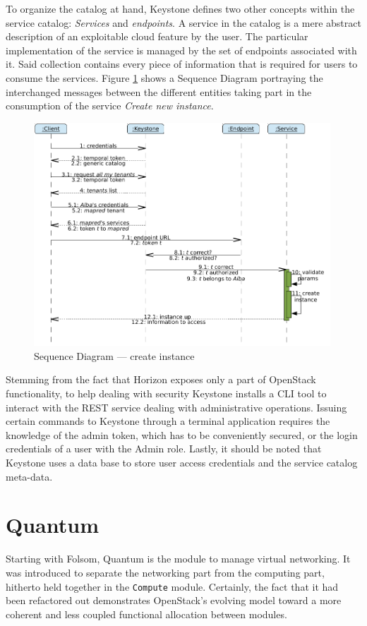 To organize the catalog at hand, Keystone defines two other concepts within the service catalog: \emph{Services} and \emph{endpoints}. A service in the catalog is a mere abstract description of an exploitable cloud feature by the user. The particular implementation of the service is managed by the set of endpoints associated with it. Said collection contains every piece of information that is required for users to consume the services. Figure \ref{fig:secuenciais} shows a Sequence Diagram portraying the interchanged messages between the different entities taking part in the consumption of the service \emph{Create new instance}.

\begin{figure}[tbp]
\begin{center}
\includegraphics[width=0.99\textwidth]{imagenes/013.pdf}
 \caption{Sequence Diagram --- create instance}
\label{fig:secuenciais}
\end{center}
\end{figure}

Stemming from the fact that Horizon exposes only a part of OpenStack functionality, to help dealing with security Keystone installs a CLI tool to interact with the REST service dealing with administrative operations. Issuing certain commands to Keystone through a terminal application requires the knowledge of the admin token, which has to be conveniently secured, or the login credentials of a user with the Admin role. Lastly, it should be noted that Keystone uses a data base to store user access credentials and the service catalog meta-data.

\section{Quantum}\label{sec:quantum}
\noindent Starting with Folsom, Quantum is the module to manage virtual networking. It was introduced to separate the networking part from the computing part, hitherto held together in the \texttt{Compute} module. Certainly, the fact that it had been refactored out demonstrates OpenStack's evolving model toward a more coherent and less coupled functional allocation between modules.

